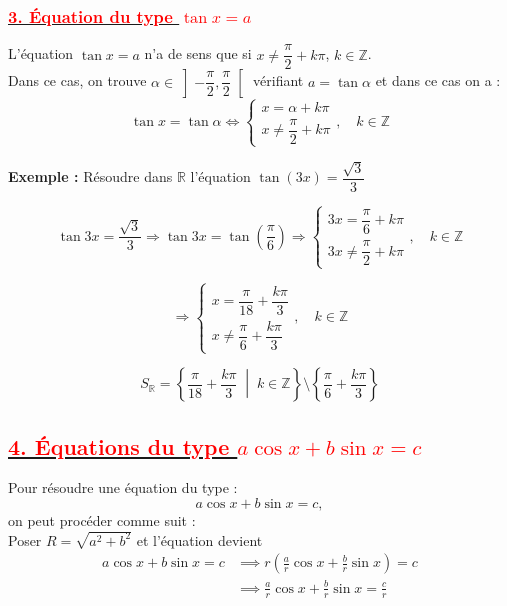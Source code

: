 \documentclass[a4paper,12pt]{article}
\begin{document}
\subsubsection*{\underline{\textcolor{red}{3. Équation du type $\tan x = a$}}}

\noindent
L'équation $\tan x = a$ n'a de sens que si $x \neq \dfrac{\pi}{2} + k\pi$, $k \in \mathbb{Z}$.\\

\noindent
Dans ce cas, on trouve $\alpha \in \left]-\dfrac{\pi}{2}, \dfrac{\pi}{2}\right[$ vérifiant $a = \tan \alpha$ et dans ce cas on a :
\[
\tan x = \tan \alpha \Leftrightarrow
\begin{cases}
x = \alpha + k\pi \\
x \neq \dfrac{\pi}{2} + k\pi
\end{cases},\quad k \in \mathbb{Z}
\]

\noindent\textbf{Exemple :} Résoudre dans \( \mathbb{R} \) l'équation \( \tan(3x) = \dfrac{\sqrt{3}}{3} \)

\[
\tan 3x = \dfrac{\sqrt{3}}{3}
\Rightarrow \tan 3x = \tan\left(\dfrac{\pi}{6}\right)
\Rightarrow 
\begin{cases}
3x = \dfrac{\pi}{6} + k\pi \\
3x \neq \dfrac{\pi}{2} + k\pi
\end{cases},\quad k \in \mathbb{Z}
\]

\[
\Rightarrow 
\begin{cases}
x = \dfrac{\pi}{18} + \dfrac{k\pi}{3} \\
x \neq \dfrac{\pi}{6} + \dfrac{k\pi}{3}
\end{cases},\quad k \in \mathbb{Z}
\]

\[
\boxed{
S_{\mathbb{R}} = \left\{ \dfrac{\pi}{18} + \dfrac{k\pi}{3} \;\middle|\; k \in \mathbb{Z} \right\} 
\setminus 
\left\{ \dfrac{\pi}{6} + \dfrac{k\pi}{3} \right\}
}
\]

\subsection*{\underline{\textcolor{red}{4. Équations du type $a\cos x + b\sin x = c$}}}

\noindent
Pour résoudre une équation du type :
\[
a\cos x + b\sin x = c,
\]
on peut procéder comme suit :\\

Poser \( R = \sqrt{a^2 + b^2} \) et l’équation devient
\[
\begin{aligned}
    a\cos x + b\sin x = c &\implies r\left( \frac{a}{r}\cos x + \frac{b}{r}\sin x \right) = c\\
    &\implies\frac{a}{r}\cos x + \frac{b}{r}\sin x = \frac{c}{r}
\end{aligned}
\]
\end{document}
